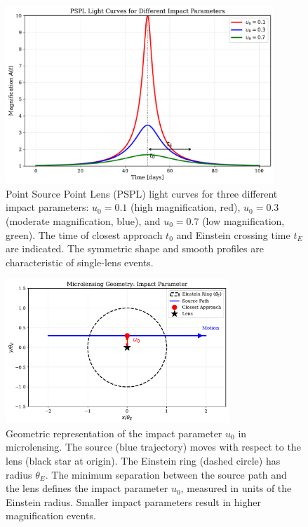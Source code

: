 \begin{figure}[htbp]
    \centering
    \includegraphics[width=0.9\textwidth]{figures/fig_pspl_lightcurve.pdf}
    \caption[PSPL light curves for different impact parameters.]{Point Source Point Lens (PSPL) light curves for three different impact parameters: $u_0 = 0.1$ (high magnification, red), $u_0 = 0.3$ (moderate magnification, blue), and $u_0 = 0.7$ (low magnification, green). The time of closest approach $t_0$ and Einstein crossing time $t_E$ are indicated. The symmetric shape and smooth profiles are characteristic of single-lens events.}
    \label{fig:pspl_lightcurve}
\end{figure}

\begin{figure}[htbp]
    \centering
    \includegraphics[width=0.75\textwidth]{figures/fig_impact_parameter.pdf}
    \caption[Microlensing geometry showing impact parameter.]{Geometric representation of the impact parameter $u_0$ in microlensing. The source (blue trajectory) moves with respect to the lens (black star at origin). The Einstein ring (dashed circle) has radius $\theta_E$. The minimum separation between the source path and the lens defines the impact parameter $u_0$, measured in units of the Einstein radius. Smaller impact parameters result in higher magnification events.}
    \label{fig:impact_parameter}
\end{figure}

